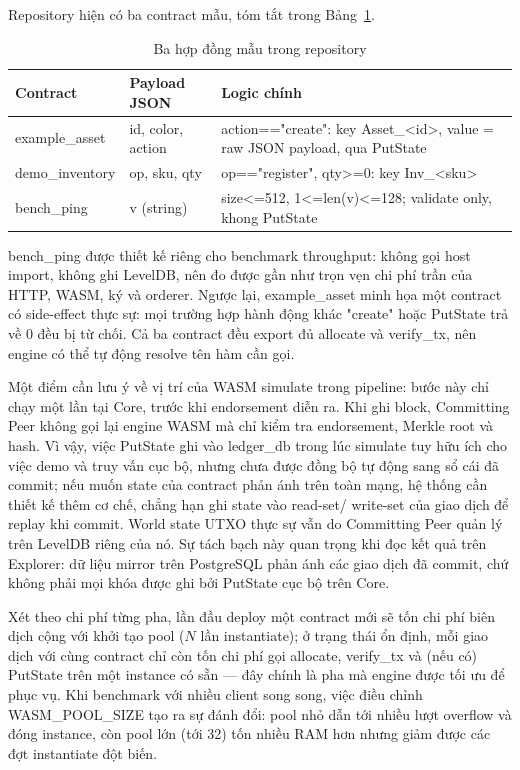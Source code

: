 Repository hiện có ba contract mẫu, tóm tắt trong Bảng~\ref{tab:sample-contracts}.

\begin{table}[H]
\centering
\caption{Ba hợp đồng mẫu trong repository}
\label{tab:sample-contracts}
\begin{tabular}{@{}p{2.6cm}p{3.2cm}p{5.6cm}@{}}
\toprule
Contract & Payload JSON & Logic chính \\
\midrule
example\_asset & id, color, action & action=="create": key Asset\_<id>, value = raw JSON payload, qua PutState \\
demo\_inventory & op, sku, qty & op=="register", qty>=0: key Inv\_<sku> \\
bench\_ping & v (string) & size<=512, 1<=len(v)<=128; validate only, khong PutState \\
\bottomrule
\end{tabular}
\end{table}

bench\_ping được thiết kế riêng cho benchmark throughput: không gọi
host import, không ghi LevelDB, nên đo được gần như trọn vẹn chi phí trần của
HTTP, WASM, ký và orderer. Ngược lại, example\_asset minh họa một
contract có side-effect thực sự: mọi trường hợp hành động khác "create"
hoặc PutState trả về 0 đều bị từ chối. Cả ba contract đều export đủ
allocate và verify\_tx, nên engine có thể tự động resolve tên
hàm cần gọi.

Một điểm cần lưu ý về vị trí của WASM simulate trong pipeline: bước này chỉ
chạy một lần tại Core, trước khi endorsement diễn ra. Khi ghi block, Committing
Peer không gọi lại engine WASM mà chỉ kiểm tra endorsement, Merkle root và
hash. Vì vậy, việc PutState ghi vào ledger\_db trong lúc
simulate tuy hữu ích cho việc demo và truy vấn cục bộ, nhưng chưa được đồng bộ
tự động sang sổ cái đã commit; nếu muốn state của contract phản ánh trên toàn
mạng, hệ thống cần thiết kế thêm cơ chế, chẳng hạn ghi state vào read-set/
write-set của giao dịch để replay khi commit. World state UTXO thực sự vẫn do
Committing Peer quản lý trên LevelDB riêng của nó. Sự tách bạch này quan trọng
khi đọc kết quả trên Explorer: dữ liệu mirror trên PostgreSQL phản ánh các giao
dịch đã commit, chứ không phải mọi khóa được ghi bởi PutState cục bộ
trên Core.

Xét theo chi phí từng pha, lần đầu deploy một contract mới sẽ tốn chi phí biên
dịch cộng với khởi tạo pool ($N$ lần instantiate); ở trạng thái ổn định, mỗi
giao dịch với cùng contract chỉ còn tốn chi phí gọi allocate,
verify\_tx và (nếu có) PutState trên một instance có sẵn ---
đây chính là pha mà engine được tối ưu để phục vụ. Khi benchmark với nhiều
client song song, việc điều chỉnh WASM\_POOL\_SIZE tạo ra sự đánh đổi:
pool nhỏ dẫn tới nhiều lượt overflow và đóng instance, còn pool lớn (tới 32)
tốn nhiều RAM hơn nhưng giảm được các đợt instantiate đột biến.

